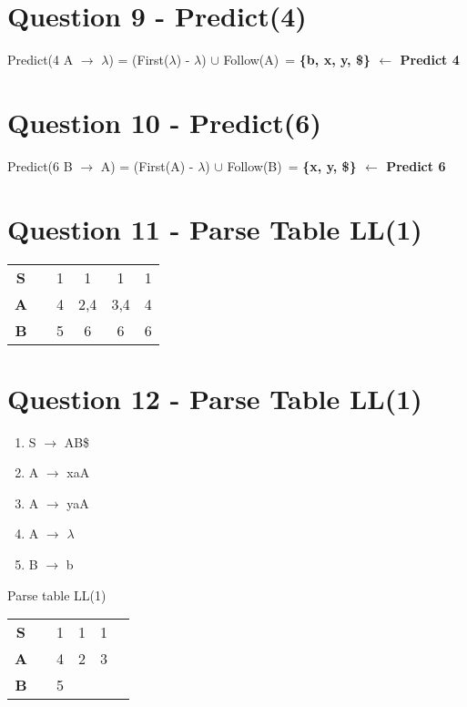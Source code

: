 \documentclass{article}
\begin{document}
\section*{Question 9 - Predict(4)}
\vspace{-1em}
\hspace{-.3cm}Predict(4 A $\rightarrow$ $\lambda$) = (First($\lambda$) - $\lambda$) $\cup$ Follow(A)\ = \textbf{\{b, x, y, \$\} $\leftarrow$ Predict 4}

\section*{Question 10 - Predict(6)}
\vspace{-1em}
\hspace{-.3cm}Predict(6 B $\rightarrow$ A) = (First(A) - $\lambda$) $\cup$ Follow(B)\ = \textbf{\{x, y, \$\} $\leftarrow$ Predict 6}

\section*{Question 11 - Parse Table LL(1)}
  \begin{tabular}{|c|c|c|c|c|c|}
    \hline
	 & \thead{a} & \thead{b} & \thead{x} & \thead{y} & \thead{\$}\\
    \hline
	\textbf{S} &  & 1 & 1 & 1 & 1\\
    \hline
	\textbf{A} &  & 4 & 2,4 & 3,4 & 4\\
    \hline
	\textbf{B} &  & 5 & 6  & 6 & 6 \\
    \hline
\end{tabular}

\newpage
\section*{Question 12 - Parse Table LL(1)}
\vspace{-1.5em}
\begin{multicols}{2}
  \begin{enumerate}
    \setlength\itemsep{-.25em}
    \item S $\rightarrow$ AB\$
    \item A $\rightarrow$ xaA
    \item A $\rightarrow$ yaA
    \item A $\rightarrow$ $\lambda$
    \item B $\rightarrow$ b
  \end{enumerate}
  Parse table LL(1)\newline
  \begin{tabular}{|c|c|c|c|c|c|}
    \hline
	  & \thead{a} & \thead{b} & \thead{x} & \thead{y} & \thead{\$}\\
    \hline
	\textbf{S} &  & 1 & 1 & 1 & \\
    \hline
	\textbf{A} &  & 4 & 2 & 3 & \\
    \hline
	\textbf{B} &  & 5 &   &   & \\
    \hline
\end{tabular}
\end{multicols}
\end{document}
